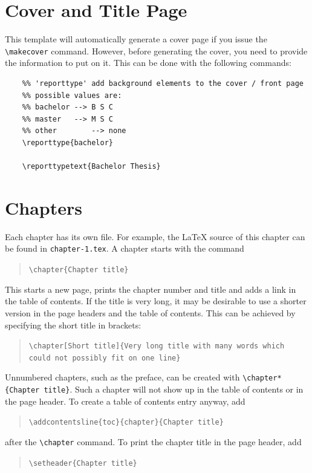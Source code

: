 \section{Cover and Title Page}

This template will automatically generate a cover page if you issue the \texttt{\textbackslash makecover} command. However, before generating the cover, you need to provide the information to put on it. This can be done with the following commands:

\begin{lstlisting}
	%% 'reporttype' add background elements to the cover / front page
	%% possible values are:
	%% bachelor	--> B S C
	%% master	--> M S C
	%% other		--> none
	\reporttype{bachelor}
	
	\reporttypetext{Bachelor Thesis}
\end{lstlisting}

\section{Chapters}

Each chapter has its own file. For example, the \LaTeX{} source of this chapter can be found in \texttt{chapter-1.tex}. A chapter starts with the command
\begin{quote}
	\texttt{\textbackslash chapter\{Chapter title\}}
\end{quote}
This starts a new page, prints the chapter number and title and adds a link in the table of contents. If the title is very long, it may be desirable to use a shorter version in the page headers and the table of contents. This can be achieved by specifying the short title in brackets:
\begin{quote}
	\texttt{\textbackslash chapter[Short title]\{Very long title with many words which could not possibly fit on one line\}}
\end{quote}
Unnumbered chapters, such as the preface, can be created with \texttt{\textbackslash chapter*\{Chapter title\}}. Such a chapter will not show up in the table of contents or in the page header. To create a table of contents entry anyway, add
\begin{quote}
	\texttt{\textbackslash addcontentsline\{toc\}\{chapter\}\{Chapter title\}}
\end{quote}
after the \texttt{\textbackslash chapter} command. To print the chapter title in the page header, add
\begin{quote}
	\texttt{\textbackslash setheader\{Chapter title\}}
\end{quote}

